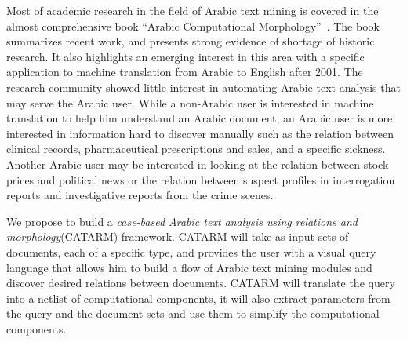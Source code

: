 \documentclass[12pt]{article}
\begin{document}
Most of academic research in the field of Arabic text mining 
is covered in the almost comprehensive book 
``Arabic Computational Morphology''~\cite{Sou07}.
The book summarizes recent work, and presents strong evidence of 
shortage of historic research. It also highlights  an emerging 
interest in this area with a specific application to machine 
translation from Arabic to English after 2001.
The research community showed little interest in 
automating Arabic text analysis that may serve
the Arabic user.
While a non-Arabic user is interested in machine translation to 
help him understand an Arabic document, 
an Arabic user is more interested in 
information hard to discover manually such as 
the relation between clinical records, pharmaceutical 
prescriptions and sales, and a specific sickness. 
Another Arabic user may be interested in looking at the relation
between stock prices and political news or the 
relation between suspect profiles in interrogation reports 
and investigative reports from the crime scenes. 

We propose to build a 
{\em case-based Arabic text analysis using relations and morphology}(CATARM) framework. 
CATARM will take as input sets of documents, each of a specific
type, and provides the user with a visual query language that
allows him to build a flow of Arabic text mining
modules and discover desired relations between documents. 
CATARM will translate the query into a netlist of computational 
components, it will also extract parameters from the query and 
the document sets and use them to simplify the computational 
components. 

\end{document}
